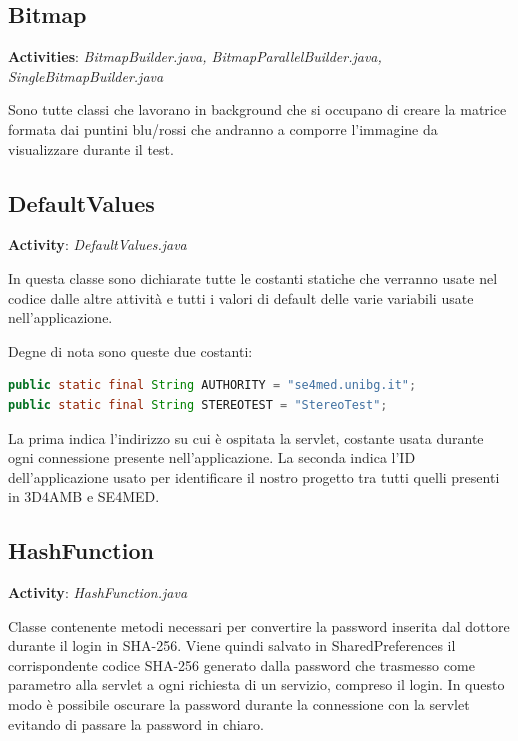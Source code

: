 \documentclass[
	corpo=12pt,
	twoside,
 	evenboxes,
	tipotesi=triennale,
    	stile=classica,
   	 greek,
]{toptesi}
\begin{document}
\subsection{Bitmap}
\label{subsec:bitmap}
\textbf{Activities}: \textit{BitmapBuilder.java, BitmapParallelBuilder.java, SingleBitmapBuilder.java}

Sono tutte classi che lavorano in background che si occupano di creare la matrice formata dai puntini blu/rossi che andranno a comporre l'immagine da visualizzare durante il test.

\subsection{DefaultValues}
\label{subsec:defaultvalues}
\textbf{Activity}: \textit{DefaultValues.java}

In questa classe sono dichiarate tutte le costanti statiche che verranno usate nel codice dalle altre attività e tutti i valori di default delle varie variabili usate nell'applicazione.

Degne di nota sono queste due costanti:

\begin{lstlisting}[language=Java, label=lst:constant, caption={}]
public static final String AUTHORITY = "se4med.unibg.it";
public static final String STEREOTEST = "StereoTest";
\end{lstlisting}

La prima indica l'indirizzo su cui è ospitata la servlet, costante usata durante ogni connessione presente nell'applicazione. La seconda indica l'ID dell'applicazione usato per identificare il nostro progetto tra tutti quelli presenti in 3D4AMB e SE4MED.

\subsection{HashFunction}
\label{subsec:hashfunction}
\textbf{Activity}: \textit{HashFunction.java}

Classe contenente metodi necessari per convertire la password inserita dal dottore durante il login in SHA-256. Viene quindi salvato in SharedPreferences il corrispondente codice SHA-256 generato dalla password che trasmesso come parametro alla servlet a ogni richiesta di un servizio, compreso il login. In questo modo è possibile oscurare la password durante la connessione con la servlet evitando di passare la password in chiaro.

\vfill
\end{document}
